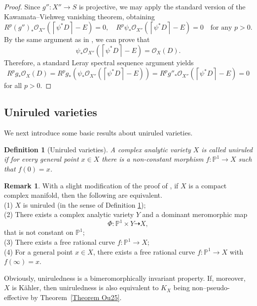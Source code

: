 \documentclass[12pt]{amsart}
\numberwithin{equation}{section}
\theoremstyle{definition}
\theoremstyle{plain}
\newtheorem{definition}  [theorem]     {Definition}
\newtheorem*{thm A*}{Theorem A}
\newtheorem*{thm B*}{Theorem B}
\newtheorem*{thm C*}{Theorem C}
\newtheorem*{thm D*}{Theorem D}
\theoremstyle{definition}
\newtheorem{remark}  [theorem]     {Remark}
\renewcommand{\1}{\mathds{1}}
\renewcommand{\>}{\rightarrow}
\begin{document}
\begin{proof}
Since $g'':X'' \to S$ is projective, we may apply the standard version of the Kawamata--Viehweg vanishing theorem, obtaining
$$
R^p(g'')_* \mathcal{O}_{X''}(\left\lceil\psi^*D\right\rceil - E) = 0, \quad 
R^p \psi_* \mathcal{O}_{X''}(\left\lceil\psi^*D\right\rceil - E) = 0 \quad \text{for any } p > 0.
$$
By the same argument as in \cite[Lemma 5.1]{DH24}, we can prove that $$
\psi_* \mathcal{O}_{X''}(\left\lceil\psi^*D\right\rceil - E) = \mathcal{O}_X(D).
$$ Therefore, a standard Leray spectral sequence argument yields
$$
R^p g_* \mathcal{O}_X(D) 
= R^p g_*(\psi_* \mathcal{O}_{X''}(\left\lceil\psi^*D\right\rceil - E)) 
= R^p g''_* \mathcal{O}_{X''}(\left\lceil\psi^*D\right\rceil - E) 
= 0
$$
for all $p > 0$.
\end{proof}


\subsection{Uniruled varieties}We next introduce some basic results about uniruled varieties.
\begin{definition}[Uniruled varieties]\label{Def: Uniruled}
A complex analytic variety $X$ is called \emph{uniruled} if for every general point $x\in X$ there is a non-constant morphism $f:  \mathbb{P}^1\to X$ such that $f(0) = x$.
\end{definition}

\begin{remark}\label{charaterization-uniruled}
With a slight modification of the proof of \cite[Proposition II.5.4]{MP97}, if $X$ is a compact complex manifold, then the following are equivalent.\\
(1) $X$ is uniruled (in the sense of Definition \ref{Def: Uniruled});\\
(2) There exists a complex analytic variety $Y$ and a dominant meromorphic map $$\Phi: \mathbb{P}^1 \times Y  \dashrightarrow X,$$that is not constant on $\mathbb{P}^1$;\\
(3) There exists a free rational curve $f: \mathbb{P}^1 \to X$;\\
(4) For a general point $x\in X$, there exists a free rational curve $f: \mathbb{P}^1 \to X$ with $f(\infty) = x$. 

Obviously, uniruledness is a bimeromorphically invariant property. If, moreover, $X$ is K\"ahler, then uniruledness is also equivalent to $K_X$ being non–pseudo-effective by Theorem~\ref{Theorem Ou25}.
\end{remark}
\end{document}
